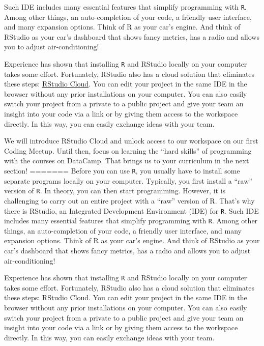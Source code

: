 \documentclass[
  11pt,
]{article}
\begin{document}
Such IDE includes many essential features that simplify programming with \texttt{R}.
Among other things, an auto-completion of your code, a friendly user interface, and many expansion options.
Think of R as your car's engine.
And think of RStudio as your car's dashboard that shows fancy metrics, has a radio and allows you to adjust air-conditioning!

Experience has shown that installing \texttt{R} and RStudio locally on your computer takes some effort.
Fortunately, RStudio also has a cloud solution that eliminates these steps: \href{https://rstudio.cloud}{RStudio Cloud}.
You can edit your project in the same IDE in the browser without any prior installations on your computer.
You can also easily switch your project from a private to a public project and give your team an insight into your code via a link or by giving them access to the workspace directly.
In this way, you can easily exchange ideas with your team.

We will introduce RStudio Cloud and unlock access to our workspace on our first Coding Meetup.
Until then, focus on learning the ``hard skills'' of programming with the courses on DataCamp.
That brings us to your curriculum in the next section!
=======
Before you can use \texttt{R}, you usually have to install some separate programs locally on your computer. Typically, you first install a ``raw'' version of \texttt{R}. In theory, you can then start programming. However, it is challenging to carry out an entire project with a ``raw'' version of R. That's why there is RStudio, an Integrated Development Environment (IDE) for \texttt{R}. Such IDE includes many essential features that simplify programming with \texttt{R}. Among other things, an auto-completion of your code, a friendly user interface, and many expansion options. Think of R as your car's engine. And think of RStudio as your car's dashboard that shows fancy metrics, has a radio and allows you to adjust air-conditioning!

Experience has shown that installing \texttt{R} and RStudio locally on your computer takes some effort. Fortunately, RStudio also has a cloud solution that eliminates these steps: RStudio Cloud. You can edit your project in the same IDE in the browser without any prior installations on your computer. You can also easily switch your project from a private to a public project and give your team an insight into your code via a link or by giving them access to the workspace directly. In this way, you can easily exchange ideas with your team.
\end{document}
